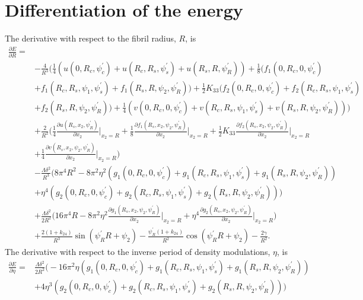 \documentclass[12pt]{article}
\begin{document}
\section{Differentiation of the energy}
The derivative with respect to the fibril radius, $R$, is
\begin{align}
\frac{\partial E}{\partial R}=&\nonumber\\
&-\frac{4}{R^3}\bigg(\frac{1}{4}(u(0,R_c,\psi_c^{\prime})+u(R_c,R_s,\psi_s^{\prime})+u(R_s,R,\psi_R^{\prime}))+\frac{1}{8}(f_1(0,R_c,0,\psi_c^{\prime})\nonumber\\
&+f_1(R_c,R_s,\psi_1,\psi_s^{\prime})+f_1(R_s,R,\psi_2,\psi_R^{\prime}))+\frac{1}{2}K_{33}(f_2(0,R_c,0,\psi_c^{\prime})+f_2(R_c,R_s,\psi_1,\psi_s^{\prime})\nonumber\\
&+f_2(R_s,R,\psi_2,\psi_R^{\prime}))+\frac{1}{4}(v(0,R_c,0,\psi_c^{\prime})+v(R_c,R_s,\psi_1,\psi_s^{\prime})+v(R_s,R,\psi_2,\psi_R^{\prime}))\bigg)\nonumber\\
&+\frac{2}{R^2}\bigg(\frac{1}{4}\frac{\partial u(R_s,x_2,\psi_R^{\prime})}{\partial x_2}\bigg|_{x_2=R}+\frac{1}{8}\frac{\partial f_1(R_s,x_2,\psi_2,\psi_R^{\prime})}{\partial x_2}\bigg|_{x_2=R}+\frac{1}{2}K_{33}\frac{\partial f_2(R_s,x_2,\psi_2,\psi_R^{\prime})}{\partial x_2}\bigg|_{x_2=R}\nonumber\\
&+\frac{1}{4}\frac{\partial v(R_s,x_2,\psi_2,\psi_R^{\prime})}{\partial x_2}\bigg|_{x_2=R}\bigg)\nonumber\\
&-\frac{\Lambda\delta^2}{R^3}\big(8\pi^4R^2-8\pi^2\eta^2(g_1(0,R_c,0,\psi_c^{\prime})+g_1(R_c,R_s,\psi_1,\psi_s^{\prime})+g_1(R_s,R,\psi_2,\psi_R^{\prime}))\nonumber\\
&+\eta^4(g_2(0,R_c,0,\psi_c^{\prime})+g_2(R_c,R_s,\psi_1,\psi_s^{\prime})+g_2(R_s,R,\psi_2,\psi_R^{\prime}))\big)\nonumber\\
&+\frac{\Lambda\delta^2}{2R^2}\bigg(16\pi^4R-8\pi^2\eta^2\frac{\partial g_1(R_s,x_2,\psi_2,\psi_R^{\prime})}{\partial x_2}\bigg|_{x_2=R}+\eta^4\frac{\partial g_2(R_s,x_2,\psi_2,\psi_R^{\prime})}{\partial x_2}\bigg|_{x_2=R}\bigg)\nonumber\\
&+\frac{2(1+k_{24})}{R^3}\sin(\psi_R^{\prime}R+\psi_2)-\frac{\psi_R^{\prime}(1+k_{24})}{R^2}\cos(\psi_R^{\prime}R+\psi_2)-\frac{2\gamma}{R^2}.\label{eq:dEdR}
\end{align}
The derivative with respect to the inverse period of density modulations, $\eta$, is
\begin{align}
\frac{\partial E}{\partial \eta}=&
\frac{\Lambda\delta^2}{2R^2}\big(-16\pi^2\eta(g_1(0,R_c,0,\psi_c^{\prime})+g_1(R_c,R_s,\psi_1,\psi_s^{\prime})+g_1(R_s,R,\psi_2,\psi_R^{\prime}))\nonumber\\
&+4\eta^3(g_2(0,R_c,0,\psi_c^{\prime})+g_2(R_c,R_s,\psi_1,\psi_s^{\prime})+g_2(R_s,R,\psi_2,\psi_R^{\prime}))\big)\label{eq:dEdeta}
\end{align}
\end{document}
